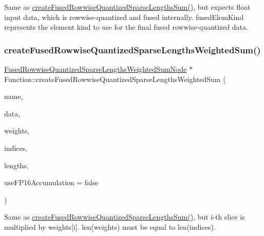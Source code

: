 Same as \hyperlink{classglow_1_1_function_a1ec48696db840ba590510e6c282b3a38}{create\+Fused\+Rowwise\+Quantized\+Sparse\+Lengths\+Sum()}, but expects float input {\ttfamily data}, which is rowwise-\/quantized and fused internally. {\ttfamily fused\+Elem\+Kind} represents the element kind to use for the final fused rowwise-\/quantized data. \mbox{\label{classglow_1_1_function_acc35291a608ce9d7aa2806ed50fa1e1b}} 
\subsubsection{\texorpdfstring{create\+Fused\+Rowwise\+Quantized\+Sparse\+Lengths\+Weighted\+Sum()}{createFusedRowwiseQuantizedSparseLengthsWeightedSum()}\hspace{0.1cm}{\footnotesize\ttfamily [1/2]}}
{\footnotesize\ttfamily \hyperlink{classglow_1_1_fused_rowwise_quantized_sparse_lengths_weighted_sum_node}{Fused\+Rowwise\+Quantized\+Sparse\+Lengths\+Weighted\+Sum\+Node} $\ast$ Function\+::create\+Fused\+Rowwise\+Quantized\+Sparse\+Lengths\+Weighted\+Sum (\begin{DoxyParamCaption}\item[{llvm\+::\+String\+Ref}]{name,  }\item[{\hyperlink{structglow_1_1_node_value}{Node\+Value}}]{data,  }\item[{\hyperlink{structglow_1_1_node_value}{Node\+Value}}]{weights,  }\item[{\hyperlink{structglow_1_1_node_value}{Node\+Value}}]{indices,  }\item[{\hyperlink{structglow_1_1_node_value}{Node\+Value}}]{lengths,  }\item[{bool}]{use\+F\+P16\+Accumulation = {\ttfamily false} }\end{DoxyParamCaption})}

Same as \hyperlink{classglow_1_1_function_a1ec48696db840ba590510e6c282b3a38}{create\+Fused\+Rowwise\+Quantized\+Sparse\+Lengths\+Sum()}, but i-\/th slice is multiplied by weights\mbox{[}i\mbox{]}. len(weights) must be equal to len(indices). \mbox{\label{classglow_1_1_function_a4463d76e607351b153d5c4704e9b26bb}} 
